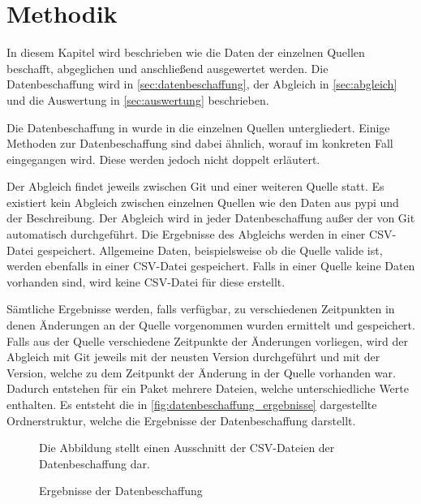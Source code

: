 \chapter{Methodik}
\label{chap:methodik}
In diesem Kapitel wird beschrieben wie die Daten der einzelnen Quellen beschafft, abgeglichen und anschließend ausgewertet werden.
Die Datenbeschaffung wird in \autoref{sec:datenbeschaffung}, der Abgleich in \autoref{sec:abgleich} und die Auswertung in \autoref{sec:auswertung} beschrieben.

Die Datenbeschaffung in wurde in die einzelnen Quellen untergliedert.
Einige Methoden zur Datenbeschaffung sind dabei ähnlich, worauf im konkreten Fall eingegangen wird.
Diese werden jedoch nicht doppelt erläutert.

Der Abgleich findet jeweils zwischen Git und einer weiteren Quelle statt.
Es existiert kein Abgleich zwischen einzelnen Quellen wie den Daten aus \gls{pypi} und der Beschreibung.
Der Abgleich wird in jeder Datenbeschaffung außer der von Git automatisch durchgeführt.
Die Ergebnisse des Abgleichs werden in einer CSV-Datei gespeichert.
Allgemeine Daten, beispielsweise ob die Quelle valide ist, werden ebenfalls in einer CSV-Datei gespeichert.
Falls in einer Quelle keine Daten vorhanden sind, wird keine CSV-Datei für diese erstellt.

Sämtliche Ergebnisse werden, falls verfügbar, zu verschiedenen Zeitpunkten in denen Änderungen an der Quelle vorgenommen wurden ermittelt und gespeichert.
Falls aus der Quelle verschiedene Zeitpunkte der Änderungen vorliegen, wird der Abgleich mit Git jeweils mit der neusten Version durchgeführt und mit der Version, welche zu dem Zeitpunkt der Änderung in der Quelle vorhanden war.
Dadurch entstehen für ein Paket mehrere Dateien, welche unterschiedliche Werte enthalten.
Es entsteht die in \autoref{fig:datenbeschaffung_ergebnisse} dargestellte Ordnerstruktur, welche die Ergebnisse der Datenbeschaffung darstellt.

\begin{figure}
    \centering
    \caption{Ergebnisse der Datenbeschaffung}
    \label{fig:datenbeschaffung_ergebnisse}
    \small
    Die Abbildung stellt einen Ausschnitt der CSV-Dateien der Datenbeschaffung dar.
\end{figure}


